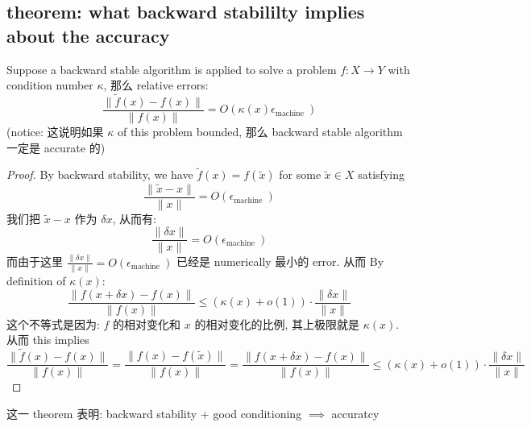 \subsection{theorem: what backward stabililty implies about the accuracy}
\begin{theorem} Suppose a backward stable algorithm is applied to solve a problem $f: X \rightarrow Y$ with condition number $\kappa$, 那么 relative errors:
$$
\frac{\|\tilde{f}(x)-f(x)\|}{\|f(x)\|}=O\left(\kappa(x) \epsilon_{\text {machine }}\right) 
$$
(notice: 这说明如果 $\kappa$ of this problem bounded, 那么 backward stable algorithm 一定是 accurate 的)
\end{theorem}
\begin{proof}
By backward stability, we have $\tilde{f}(x)=f(\tilde{x})$ for some $\tilde{x} \in X$ satisfying $$
\frac{\|\tilde{x}-x\|}{\|x\|}=O\left(\epsilon_{\text {machine }}\right) 
$$
我们把 $\tilde{x}-x$ 作为 $\delta x$, 从而有: $$
\frac{\|\delta x\|}{\|x\|}=O\left(\epsilon_{\text {machine }}\right)
$$
而由于这里 $\frac{\|\delta x\|}{\|x\|}=O\left(\epsilon_{\text {machine }}\right)$ 已经是 numerically 最小的 error. 从而   By definition of $\kappa(x)$: $$
\frac{\|f(x+\delta x)-f(x)\|}{\|f(x)\|} \leq (\kappa(x) + o(1)) \cdot \frac{\|\delta x\|}{\|x\|}
$$这个不等式是因为: $f$ 的相对变化和 $x$ 的相对变化的比例, 其上极限就是 $\kappa (x)$. 从而 this implies
$$
\frac{\|\tilde{f}(x)-f(x)\|}{\|f(x)\|}  = \frac{\|{f}(x)-f(\tilde{x})\|}{\|f(x)\|}  = \frac{\|f(x+\delta x)-f(x)\|}{\|f(x)\|}\leq(\kappa(x) + o(1)) \cdot \frac{\|\delta x\|}{\|x\|}
$$
\end{proof}
这一 theorem 表明: backward stability + good conditioning $\implies$ accuratcy






